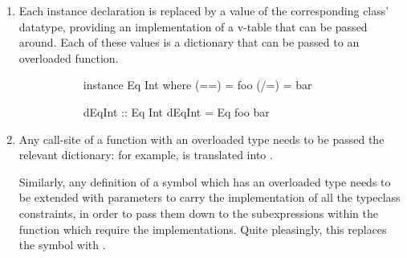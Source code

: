 \documentclass[dissertation.tex]{subfiles}
\begin{document}
{{{\begin{enumerate}
{\begin{figure}[H]
\begin{subfigure}[t]{0.55\textwidth}
\begin{haskellfigure}
                (==), (/=) :: Eq a -> a -> a -> Bool
                (==) (Eq eq _) = eq
                (/=) (Eq _ neq) = neq
                \end{haskellfigure}
                \end{subfigure}
                \end{figure}
            }
            \item
            {

                Each instance declaration is replaced by a value of the corresponding class' datatype, providing an
                implementation of a v-table that can be passed around. Each of these values is a dictionary that can be
                passed to an overloaded function.

                \begin{figure}[H]
                \centering
                \begin{subfigure}[t]{0.25\textwidth}
                \begin{haskellfigure}
                instance Eq Int where
                    (==) = foo
                    (/=) = bar
                \end{haskellfigure}
                \end{subfigure}
                \hspace{5mm}
                \begin{subfigure}[t]{0.25\textwidth}
                \begin{haskellfigure}
                dEqInt :: Eq Int
                dEqInt = Eq foo bar
                \end{haskellfigure}
                \end{subfigure}
                \end{figure}
            }
            \item
            {

                Any call-site of a function with an overloaded type needs to be passed the relevant dictionary: for
                example,  is translated into .

                Similarly, any definition of a symbol which has an overloaded type needs to be extended with parameters
                to carry the implementation of all the typeclass constraints, in order to pass them down to the
                subexpressions within the function which require the implementations. Quite pleasingly, this replaces
                the \haskell{=>} symbol with \haskell{->}.

}
\end{enumerate}}}}
\end{document}
